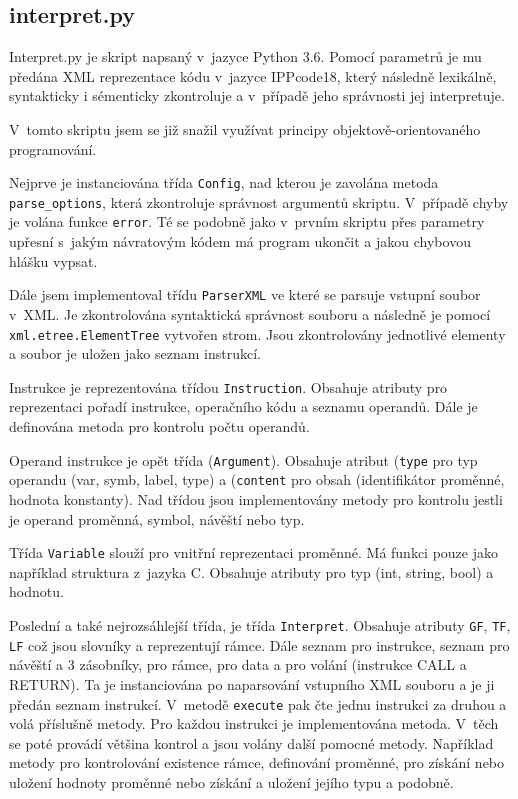 \documentclass[10pt, a4paper]{article}
\begin{document}
\subsection*{interpret.py}
	Interpret.py je skript napsaný v~jazyce Python 3.6. Pomocí parametrů je mu předána XML reprezentace kódu v~jazyce IPPcode18, který následně lexikálně, syntakticky i sémenticky zkontroluje a v~případě jeho správnosti jej interpretuje.

	V~tomto skriptu jsem se již snažil využívat principy objektově-orientovaného programování.

	Nejprve je instanciována třída \texttt{Config}, nad kterou je zavolána metoda \texttt{parse\_options}, která zkontroluje správnost argumentů skriptu. V~případě chyby je volána funkce \texttt{error}. Té se podobně jako v~prvním skriptu přes parametry upřesní s~jakým návratovým kódem má program ukončit a jakou chybovou hlášku vypsat.

	Dále jsem implementoval třídu \texttt{ParserXML} ve které se parsuje vstupní soubor v~XML. Je zkontrolována syntaktická správnost souboru a následně je pomocí \texttt{xml.etree.ElementTree} vytvořen strom. Jsou zkontrolovány jednotlivé elementy a soubor je uložen jako seznam instrukcí.

	Instrukce je reprezentována třídou \texttt{Instruction}. Obsahuje atributy pro reprezentaci pořadí instrukce, operačního kódu a seznamu operandů. Dále je definována metoda pro kontrolu počtu operandů.

	Operand instrukce je opět třída (\texttt{Argument}). Obsahuje atribut (\texttt{type} pro typ operandu (var, symb, label, type) a (\texttt{content} pro obsah (identifikátor proměnné, hodnota konstanty). Nad třídou jsou implementovány metody pro kontrolu jestli je operand proměnná, symbol, návěští nebo typ.

	Třída \texttt{Variable} slouží pro vnitřní reprezentaci proměnné. Má funkci pouze jako například struktura z~jazyka C. Obsahuje atributy pro typ (int, string, bool) a hodnotu.

	Poslední a také nejrozsáhlejší třída, je třída \texttt{Interpret}. Obsahuje atributy \texttt{GF}, \texttt{TF}, \texttt{LF} což jsou slovníky a reprezentují rámce. Dále seznam pro instrukce, seznam pro návěští a 3 zásobníky, pro rámce, pro data a pro volání (instrukce CALL a RETURN). Ta je instanciována po naparsování vstupního XML souboru a je ji předán seznam instrukcí. V~metodě \texttt{execute} pak čte jednu instrukci za druhou a volá příslušně metody. Pro každou instrukci je implementována metoda. V~těch se poté provádí většina kontrol a jsou volány další pomocné metody. Například metody pro kontrolování existence rámce, definování proměnné, pro získání nebo uložení hodnoty proměnné nebo získání a uložení jejího typu a podobně.
\end{document}
